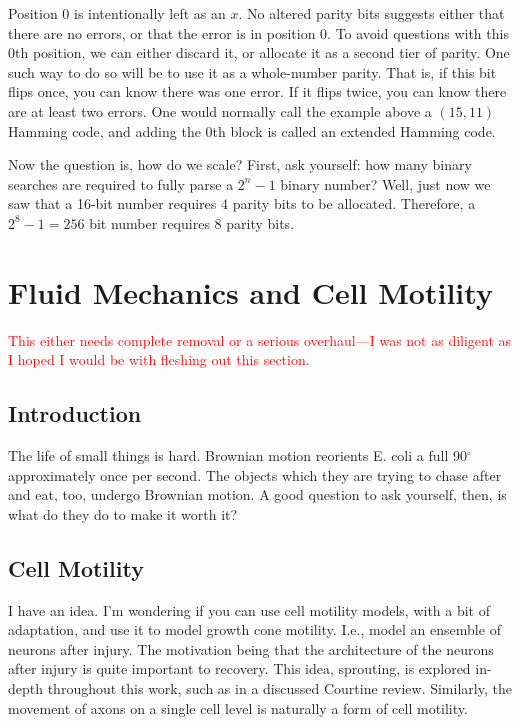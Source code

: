 Position 0 is intentionally left as an $x$. No altered parity bits suggests either that there are no errors, or that the error is in position 0. To avoid questions with this 0th position, we can either discard it, or allocate it as a second tier of parity. One such way to do so will be to use it as a whole-number parity. That is, if this bit flips once, you can know there was one error. If it flips twice, you can know there are at least two errors. One would normally call the example above a $(15,11)$ Hamming code, and adding the 0th block is called an extended Hamming code. \newline

Now the question is, how do we scale? First, ask yourself: how many binary searches are required to fully parse a $2^n - 1$ binary number? Well, just now we saw that a 16-bit number requires $4$ parity bits to be allocated. Therefore, a $2^8 - 1 = 256$ bit number requires 8 parity bits. 




\chapter{Fluid Mechanics and Cell Motility}

\textcolor{red}{This either needs complete removal or a serious overhaul---I was not as diligent as I hoped I would be with fleshing out this section.}

\section{Introduction}

The life of small things is hard. Brownian motion reorients E. coli a full 90$^\circ$ approximately once per second. The objects which they are trying to chase after and eat, too, undergo Brownian motion. A good question to ask yourself, then, is what do they do to make it worth it?

\section{Cell Motility}

I have an idea. I'm wondering if you can use cell motility models, with a bit of adaptation, and use it to model growth cone motility. I.e., model an ensemble of neurons after injury. The motivation being that the architecture of the neurons after injury is quite important to recovery. This idea, sprouting, is explored in-depth throughout this work, such as in a discussed Courtine review. Similarly, the movement of axons on a single cell level is naturally a form of cell motility. \newline

